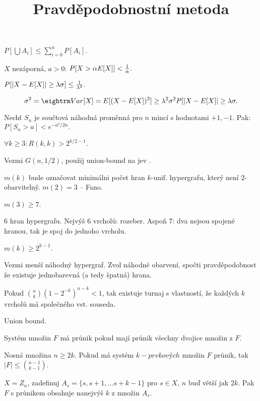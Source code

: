 

\title{Pravděpodobnostní metoda}


$P[\bigcup A_i] \le \sum_{i=0}^n P[A_i].$

 $X$ nezáporná, $a > 0$:
$P[X > \alpha E[X]] < {1 \over \alpha}.$

$P[|X-E[X]| \ge \lambda\sigma] \le {1 \over \lambda^2}.$

\prf{}
$$\sigma^2 = \var[X] = E[(X - E[X])^2] \ge \lambda^2 \sigma^2 P[|X-E[X]| \ge \lambda\sigma. $$

 Nechť $S_n$ je součtová náhodná proměnná pro $n$ mincí s hodnotami ${+1,-1}$. Pak:
$P[S_n > a] < e^{-a^2 / 2n}.$


 $\forall k \ge 3: R(k,k) > 2^{k/2 - 1}$.

\prf{} Vezmi $G(n,1/2)$, použij union-bound na jev .

\dfn{}$m(k)$ bude označovat minimálni počet hran $k$-unif. hypergrafu, který není
$2$-obarvitelný. $m(2) = 3$ -- Fano.

\obs{} $m(3) \ge 7$.

\prf{} $6$ hran hypergrafu. Nejvýš $6$ vrcholů: rozeber. Aspoň $7$: dva nejsou
spojené hranou, tak je spoj do jednoho vrcholu.

 $m(k) \ge 2^{k-1}$.

\prf{} Vezmi menší náhodný hypergraf. Zvol náhodné obarvení, spočti
pravděpodobnost že existuje jednobarevná (a tedy špatná) hrana.

\thm{} Pokud ${n \choose k} (1 - 2^{-k})^{n-k} <1$, tak existuje turnaj
s vlastností, že každých $k$ vrcholů má společného vst. souseda.

\prf{} Union bound.


\dfn{} Systém množin $F$ {\I má průnik} pokud mají průnik všechny dvojice množin z $F$.

 Nosná množina $n \ge 2k$. Pokud má systém
$k-prvkových$ množin $F$ průnik, tak $|F| \le {n-1 \choose k-1}$.

 $X = Z_n$, zadefinuj $A_s = \{s,s+1,\dots s+k-1\}$ pro $s \in X$, $n$ buď
větší jak $2k$.  Pak $F$ s průnikem obsahuje nanejvýš $k$ z množin $A_s$.

